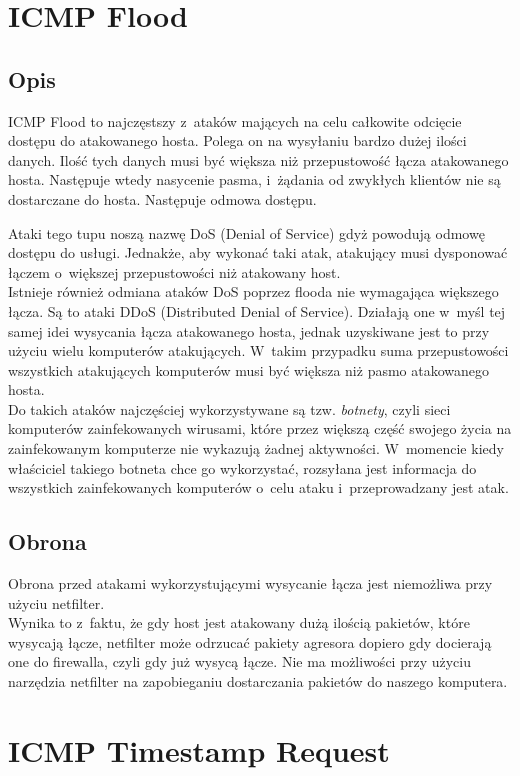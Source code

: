 \documentclass[a4paper,12pt,oneside]{book}
\begin{document}
	\section{ICMP Flood}
		\subsection{Opis}
			ICMP Flood to najczęstszy z~ataków mających na celu całkowite odcięcie dostępu do atakowanego hosta.
			Polega on na wysyłaniu bardzo dużej ilości danych. Ilość tych danych musi być większa niż przepustowość łącza atakowanego hosta.
			Następuje wtedy nasycenie pasma, i~żądania od zwykłych klientów nie są dostarczane do hosta.
			Następuje odmowa dostępu.
			
			Ataki tego tupu noszą nazwę DoS (Denial of Service) gdyż powodują odmowę dostępu do usługi.
			Jednakże, aby wykonać taki atak, atakujący musi dysponować łączem o~większej przepustowości niż atakowany host.\\
			Istnieje również odmiana ataków DoS poprzez flooda nie wymagająca większego łącza. Są to ataki DDoS (Distributed Denial of Service).
			Działają one w~myśl tej samej idei wysycania łącza atakowanego hosta, jednak uzyskiwane jest to przy użyciu wielu komputerów atakujących.
			W~takim przypadku suma przepustowości wszystkich atakujących komputerów musi być większa niż pasmo atakowanego hosta.\\
			Do takich ataków najczęściej wykorzystywane są tzw. \textit{botnet\dywiz y}, czyli sieci komputerów zainfekowanych wirusami,
			które przez większą część swojego życia na zainfekowanym komputerze nie wykazują żadnej aktywności.
			W~momencie kiedy właściciel takiego botneta chce go wykorzystać, rozsyłana jest informacja do wszystkich zainfekowanych komputerów o~celu ataku i~przeprowadzany jest atak.
		\subsection{Obrona}
			Obrona przed atakami wykorzystującymi wysycanie łącza jest niemożliwa przy użyciu netfilter.\\
			Wynika to z~faktu, że gdy host jest atakowany dużą ilością pakietów, które wysycają łącze, netfilter może odrzucać pakiety agresora dopiero gdy docierają one do firewalla,
			czyli gdy już wysycą łącze. Nie ma możliwości przy użyciu narzędzia netfilter na zapobieganiu dostarczania pakietów do naszego komputera.
	\section{ICMP Timestamp Request}
\end{document}
